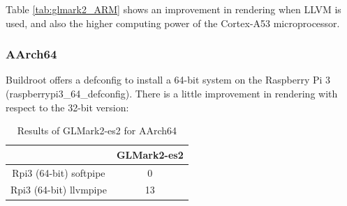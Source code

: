 \documentclass[12pt,a4paper,oneside]{article}
\begin{document}
Table \ref{tab:glmark2_ARM} shows an improvement in rendering when LLVM is used,
and also the higher computing power of the Cortex-A53 microprocessor.

\subsubsection*{AArch64}
Buildroot offers a defconfig to install a 64-bit system on the Raspberry Pi 3
(raspberrypi3\_64\_defconfig). There is a little improvement in rendering with
respect to the 32-bit version:

\begin{table}[h!]
  \begin{center}
    \caption{Results of GLMark2-es2 for AArch64}
    \label{tab:glmark2_AArch64}
    \begin{tabular}{c|c}
    & {GLMark2-es2} \\
    \hline
    Rpi3 (64-bit) softpipe & 0\\
    Rpi3 (64-bit) llvmpipe & 13\\
    \end{tabular}
  \end{center}
\end{table}
\end{document}
